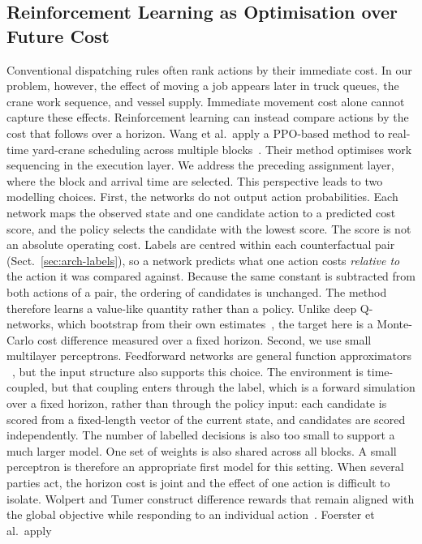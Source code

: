 \documentclass{llncs}
\begin{document}
\subsection{Reinforcement Learning as Optimisation over Future Cost}
\label{sec:rel-rl}
Conventional dispatching rules often rank actions by their immediate
cost. In our problem, however, the effect of moving a job appears later
in truck queues, the crane work sequence, and vessel supply. Immediate
movement cost alone cannot capture these effects. Reinforcement learning
can instead compare actions by the cost that follows over a horizon.
Wang et al.\ apply a PPO-based method to real-time yard-crane scheduling
across multiple blocks~\cite{ref19}. Their method optimises work
sequencing in the execution layer. We address the preceding assignment
layer, where the block and arrival time are selected.
This perspective leads to two modelling choices. First, the networks do
not output action probabilities. Each network maps the observed state
and one candidate action to a predicted cost score, and the policy
selects the candidate with the lowest score. The score is not an
absolute operating cost. Labels are centred within each counterfactual
pair (Sect.~\ref{sec:arch-labels}), so a network predicts what one
action costs \emph{relative to} the action it was compared against.
Because the same constant is subtracted from both actions of a pair, the
ordering of candidates is unchanged. The method therefore learns a
value-like quantity rather than a policy. Unlike deep Q-networks, which
bootstrap from their own estimates~\cite{refmnih}, the target here is a
Monte-Carlo cost difference measured over a fixed horizon. Second, we use small multilayer perceptrons.
Feedforward networks are general function approximators
~\cite{refhornik}, but the input structure also supports this choice.
The environment is time-coupled, but that coupling enters through the
label, which is a forward simulation over a fixed horizon, rather than
through the policy input: each candidate is scored from a fixed-length
vector of the current state, and candidates are scored independently.
The number of labelled decisions is also too small to support a much
larger model. One set of weights is also shared
across all blocks. A small perceptron is therefore an appropriate first
model for this setting.
When several parties act, the horizon cost is joint and the effect of
one action is difficult to isolate. Wolpert and Tumer construct
difference rewards that remain aligned with the global objective while
responding to an individual action~\cite{ref10}. Foerster et al.\ apply
\end{document}
